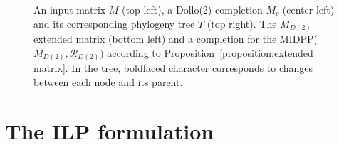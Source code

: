 \documentclass[a4paper,USenglish]{article}
\theoremstyle{definition}
\begin{document}
\begin{figure}[tb!]
  \begin{minipage}{.5\linewidth}
  \end{minipage}
  \begin{minipage}{.5\linewidth}
  \end{minipage}

  \caption{An input matrix $M$ (top left), a Dollo(2) completion $M_c$ (center
  left) and its corresponding phylogeny tree $T$ (top right). 
  The $M_{D(2)}$ extended matrix (bottom left) 
  and a completion for the MIDPP($M_{D(2)},\mathcal R_{D(2)})$
  according to Proposition~\ref{proposition:extended matrix}.
%
  In the tree, boldfaced character corresponds to changes between each
  node and its parent.  }
\label{fig:M_e}
\end{figure}

\section{The ILP formulation}
\label{sec:ilp}
\end{document}
